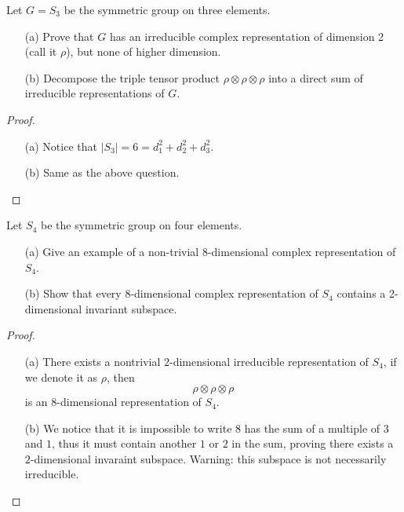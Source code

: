 \begin{prob}[F2014-Q3]
    Let \( G = S_3 \) be the symmetric group on three elements.

\begin{enumerate}
    \item[(a)] Prove that \( G \) has an irreducible complex representation of dimension 2 (call it \( \rho \)), but none of higher dimension.
    
    \item[(b)] Decompose the triple tensor product \( \rho \otimes \rho \otimes \rho \) into a direct sum of irreducible representations of \( G \).
\end{enumerate}
\end{prob}
\begin{proof}
    \begin{itemize}
        \item[(a)] Notice that $|S_3|=6=d_1^2+d_2^2+d_3^2$.
        \item[(b)] Same as the above question.  
    \end{itemize}
\end{proof}

\begin{prob}[S2006-Q6]
    Let \( S_4 \) be the symmetric group on four elements.
    \begin{itemize}
        \item[(a)] Give an example of a non-trivial 8-dimensional complex representation of \( S_4 \).
        
        \item[(b)] Show that every 8-dimensional complex representation of \( S_4 \) contains a 2-dimensional invariant subspace.
    \end{itemize}
\end{prob}
\begin{proof}
    \begin{itemize}
        \item[(a)] There exists a nontrivial $2$-dimensional irreducible representation of $S_4$, if we denote it as $\rho$, then 
        \begin{equation*}
            \rho\otimes\rho\otimes\rho
        \end{equation*}
        is an $8$-dimensional representation of $S_4$.
        \item[(b)] We notice that it is impossible to write $8$ has the sum of a multiple of $3$ and $1$, thus it must contain another $1$ or $2$ in the sum, proving there exists a $2$-dimensional invaraint subspace. Warning: this subspace is not necessarily irreducible.
    \end{itemize}
\end{proof}

